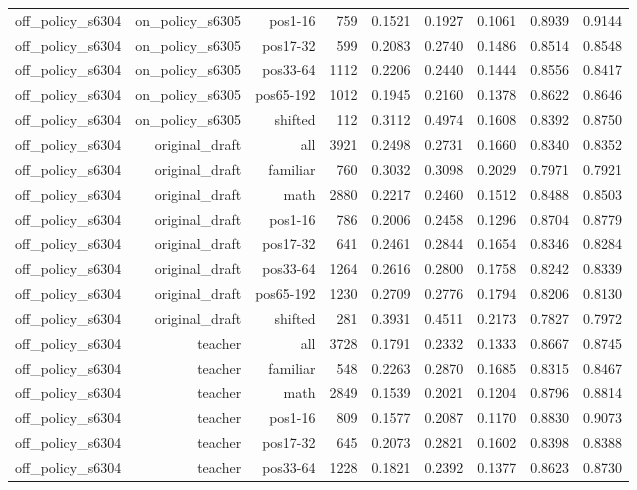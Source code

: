 \begin{tabular}{lrrrrrrrr}
off\_policy\_s6304 & on\_policy\_s6305 & pos1-16 & 759 & 0.1521 & 0.1927 & 0.1061 & 0.8939 & 0.9144 \\
off\_policy\_s6304 & on\_policy\_s6305 & pos17-32 & 599 & 0.2083 & 0.2740 & 0.1486 & 0.8514 & 0.8548 \\
off\_policy\_s6304 & on\_policy\_s6305 & pos33-64 & 1112 & 0.2206 & 0.2440 & 0.1444 & 0.8556 & 0.8417 \\
off\_policy\_s6304 & on\_policy\_s6305 & pos65-192 & 1012 & 0.1945 & 0.2160 & 0.1378 & 0.8622 & 0.8646 \\
off\_policy\_s6304 & on\_policy\_s6305 & shifted & 112 & 0.3112 & 0.4974 & 0.1608 & 0.8392 & 0.8750 \\
off\_policy\_s6304 & original\_draft & all & 3921 & 0.2498 & 0.2731 & 0.1660 & 0.8340 & 0.8352 \\
off\_policy\_s6304 & original\_draft & familiar & 760 & 0.3032 & 0.3098 & 0.2029 & 0.7971 & 0.7921 \\
off\_policy\_s6304 & original\_draft & math & 2880 & 0.2217 & 0.2460 & 0.1512 & 0.8488 & 0.8503 \\
off\_policy\_s6304 & original\_draft & pos1-16 & 786 & 0.2006 & 0.2458 & 0.1296 & 0.8704 & 0.8779 \\
off\_policy\_s6304 & original\_draft & pos17-32 & 641 & 0.2461 & 0.2844 & 0.1654 & 0.8346 & 0.8284 \\
off\_policy\_s6304 & original\_draft & pos33-64 & 1264 & 0.2616 & 0.2800 & 0.1758 & 0.8242 & 0.8339 \\
off\_policy\_s6304 & original\_draft & pos65-192 & 1230 & 0.2709 & 0.2776 & 0.1794 & 0.8206 & 0.8130 \\
off\_policy\_s6304 & original\_draft & shifted & 281 & 0.3931 & 0.4511 & 0.2173 & 0.7827 & 0.7972 \\
off\_policy\_s6304 & teacher & all & 3728 & 0.1791 & 0.2332 & 0.1333 & 0.8667 & 0.8745 \\
off\_policy\_s6304 & teacher & familiar & 548 & 0.2263 & 0.2870 & 0.1685 & 0.8315 & 0.8467 \\
off\_policy\_s6304 & teacher & math & 2849 & 0.1539 & 0.2021 & 0.1204 & 0.8796 & 0.8814 \\
off\_policy\_s6304 & teacher & pos1-16 & 809 & 0.1577 & 0.2087 & 0.1170 & 0.8830 & 0.9073 \\
off\_policy\_s6304 & teacher & pos17-32 & 645 & 0.2073 & 0.2821 & 0.1602 & 0.8398 & 0.8388 \\
off\_policy\_s6304 & teacher & pos33-64 & 1228 & 0.1821 & 0.2392 & 0.1377 & 0.8623 & 0.8730 \\

\end{tabular}

